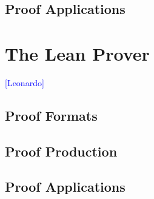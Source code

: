\documentclass{llncs}
\newcommand{\Note}[1]{\textcolor{blue}{[#1]}}
\begin{document}
\subsection{Proof Applications}

\section{The Lean Prover}
\Note{Leonardo}
\subsection{Proof Formats}
\subsection{Proof Production}
\subsection{Proof Applications}








\end{document}
